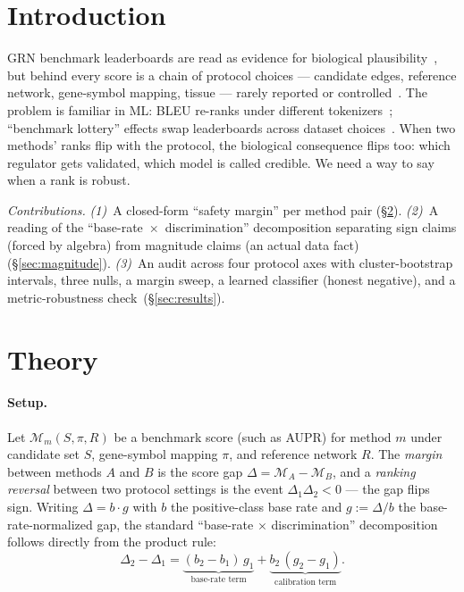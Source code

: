 \documentclass[sigconf,anonymous]{acmart}
\begin{document}
\section{Introduction}
\label{sec:intro}

GRN benchmark leaderboards are read as evidence for biological
plausibility~\cite{cui2024scgpt,theodoris2023}, but behind every score is
a chain of protocol choices --- candidate edges, reference network,
gene-symbol mapping, tissue --- rarely reported or
controlled~\cite{pratapa2020,aibar2017,huynhthu2010,anon2025evalbias}. The
problem is familiar in ML: BLEU re-ranks under different
tokenizers~\cite{post2018}; ``benchmark lottery'' effects swap
leaderboards across dataset
choices~\cite{dehghani2021,demsar2006,critchlow1985}. When two methods'
ranks flip with the protocol, the biological consequence flips too: which
regulator gets validated, which model is called credible. We need a way
to say when a rank is robust.

\emph{Contributions.} \emph{(1)}~A closed-form ``safety margin'' per
method pair (\S\ref{sec:theory}). \emph{(2)}~A reading of the
``base-rate~$\times$~discrimination'' decomposition separating sign
claims (forced by algebra) from magnitude claims (an actual data fact)
(\S\ref{sec:magnitude}). \emph{(3)}~An audit across four protocol axes
with cluster-bootstrap intervals, three nulls, a margin sweep, a learned
classifier (honest negative), and a metric-robustness
check~(\S\ref{sec:results}).

\section{Theory}
\label{sec:theory}

\paragraph{Setup.} Let $\mathcal{M}_m(S,\pi,R)$ be a benchmark score (such
as AUPR) for method $m$ under candidate set $S$, gene-symbol mapping
$\pi$, and reference network $R$. The \emph{margin} between methods $A$ and
$B$ is the score gap $\Delta = \mathcal{M}_A - \mathcal{M}_B$, and a
\emph{ranking reversal} between two protocol settings is the event
$\Delta_1 \Delta_2 < 0$ --- the gap flips sign. Writing
$\Delta = b \cdot g$ with $b$ the positive-class base rate and $g := \Delta/b$
the base-rate-normalized gap, the standard ``base-rate $\times$
discrimination'' decomposition follows directly from the product rule:
\begin{equation}
\label{eq:decomp}
\Delta_2 - \Delta_1 = \underbrace{(b_2 - b_1)\,g_1}_{\text{base-rate term}}
                    + \underbrace{b_2\,(g_2 - g_1)}_{\text{calibration term}}.
\end{equation}
\end{document}
